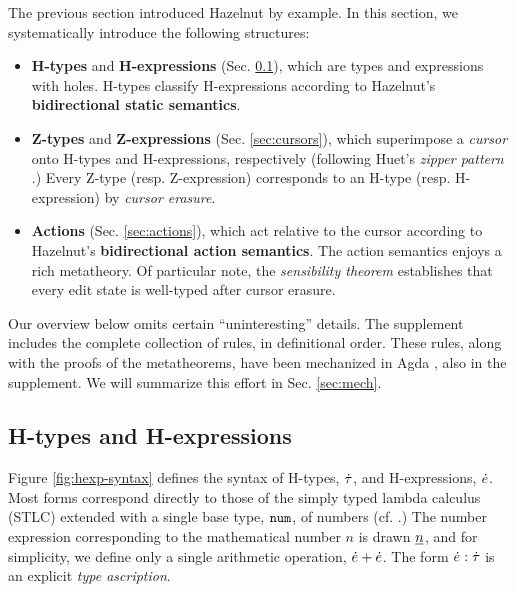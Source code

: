 
The previous section introduced Hazelnut by example. In this section, we systematically introduce the following  structures:
\begin{itemize}[itemsep=0px,partopsep=2px,topsep=2px]
\item \textbf{H-types} and \textbf{H-expressions} (Sec. \ref{sec:holes}), which are types and expressions with {holes}. H-types classify H-expressions according to Hazelnut's \textbf{bidirectional static semantics}.
\item \textbf{Z-types} and \textbf{Z-expressions} (Sec. \ref{sec:cursors}), which superimpose\- a \emph{cursor} onto H-types and H-expressions, respectively (following Huet's \emph{zipper pattern} \cite{JFP::Huet1997}.) Every Z-type (resp. Z-expression) corresponds to an H-type (resp. H-expression) by \emph{cursor erasure}.
\item \textbf{Actions} (Sec. \ref{sec:actions}), which act relative to the cursor according to Hazelnut's \textbf{bidirectional action semantics}. The action semantics enjoys a rich metatheory. Of particular note, the \emph{sensibility theorem} establishes that every edit state is well-typed after cursor erasure.
\end{itemize}

Our overview below omits certain ``uninteresting'' details. The supplement includes the complete collection of rules, in definitional order. These rules, along with the proofs of the metatheorems, have been mechanized in Agda \cite{norell:thesis}, also in the supplement. We will summarize this effort in Sec. \ref{sec:mech}.%

\subsection{H-types and H-expressions}\label{sec:holes}


Figure \ref{fig:hexp-syntax} defines the syntax of H-types, $\dot{\tau}$, and H-expressions, $\dot{e}$. Most forms correspond directly to those of the simply typed lambda calculus (STLC) extended with a single base type, $\texttt{num}$, of numbers (cf. \cite{pfpl}.) The number expression corresponding to the mathematical number $n$ is drawn $\underline{n}$, and for simplicity, we define only a single arithmetic operation, $\dot{e} + \dot{e}$. The form $\dot{e} : \dot{\tau}$ is an explicit \emph{type ascription}. 

